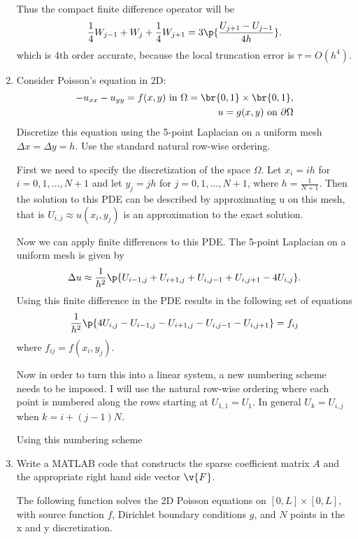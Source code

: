 \documentclass[11pt, oneside]{article}
\begin{document}
\begin{enumerate}
        Thus the compact finite difference operator will be
        \[
            \frac{1}{4} W_{j-1} + W_j + \frac{1}{4} W_{j+1} = 3\p{\frac{U_{j+1} - U_{j-1}}{4h}}.
        \]
        which is 4th order accurate, because the local truncation error is $\tau = O(h^4)$.

    \item %
        Consider Poisson's equation in 2D:
        \begin{align*}
            -u_{xx} - u_{yy} = f(x,y)\text{ in }\Omega = \br{0,1} \times \br{0,1}, \\
            u = g(x,y)\text{ on } \partial\Omega
        \end{align*}
        Discretize this equation using the 5-point Laplacian on a uniform mesh
        $\Delta x = \Delta y = h$.
        Use the standard natural row-wise ordering.

        First we need to specify the discretization of the space $\Omega$.
        Let $x_i = ih$ for $i = 0, 1, \ldots, N+1$ and let $y_j = jh$ for
        $j = 0, 1, \ldots, N+1$, where $h = \frac{1}{N+1}$.
        Then the solution to this PDE can be described by approximating u on
        this mesh, that is $U_{i,j} \approx u(x_i, y_j)$ is an approximation
        to the exact solution.

        Now we can apply finite differences to this PDE.
        The 5-point Laplacian on a uniform mesh is given by 
        \[
            \Delta u \approx \frac{1}{h^2}\p{U_{i-1,j} + U_{i+1,j} + U_{i,j-1} + U_{i,j+1} - 4U_{i,j}}.
        \]
        Using this finite difference in the PDE results in the following set
        of equations
        \[
            \frac{1}{h^2}\p{4U_{i,j} - U_{i-1,j} - U_{i+1,j} - U_{i,j-1} - U_{i,j+1}} = f_{ij}
        \]
        where $f_{ij} = f(x_i, y_j)$.

        Now in order to turn this into a linear system, a new numbering scheme
        needs to be imposed.
        I will use the natural row-wise ordering where each point is numbered
        along the rows starting at $U_{1,1} = U_1$.
        In general $U_k = U_{i,j}$ when $k = i + (j-1)N$.

        Using this numbering scheme

    \item %
        Write a MATLAB code that constructs the sparse coefficient matrix $A$
        and the appropriate right hand side vector $\v{F}$.

        The following function solves the 2D Poisson equations on
        $[0,L] \times [0, L]$, with source function $f$, Dirichlet boundary
        conditions $g$, and $N$ points in the x and y discretization.
        


\end{enumerate}
\end{document}

